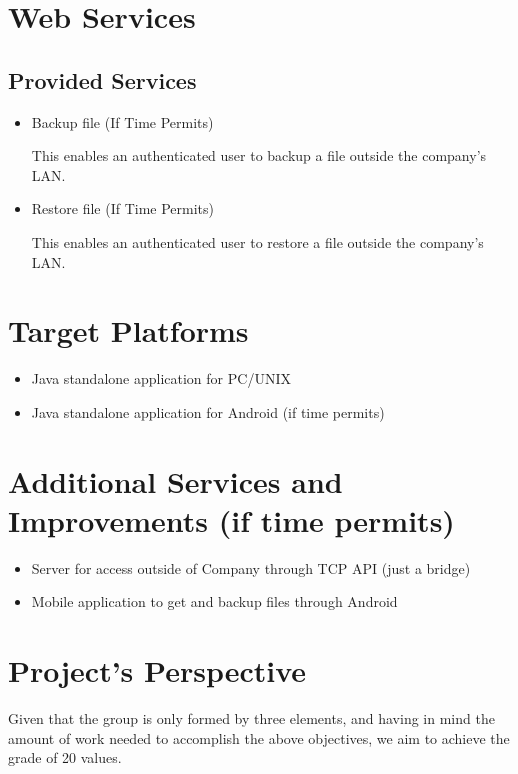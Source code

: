 \documentclass[a4paper]{article}
\begin{document}
\section{Web Services}
\subsection{Provided Services}
\begin{itemize}
\item Backup file (If Time Permits)

This enables an authenticated user to backup a file outside the company's LAN. 

\item Restore file (If Time Permits)

This enables an authenticated user to restore a file outside the company's LAN.

\end{itemize}

\section{Target Platforms}
\begin{itemize}
\item Java standalone application for PC/UNIX
\item Java standalone application for Android (if time permits)
\end{itemize}
 
\section{Additional Services and Improvements (if time permits)}
\begin{itemize}
\item Server for access outside of Company through TCP API (just a bridge)
\item Mobile application to get and backup files through Android
\end{itemize}

\section{Project's Perspective}
Given that the group is only formed by three elements, and having in mind the amount of work needed to accomplish the above objectives, we aim to achieve the grade of 20 values.
\end{document}
